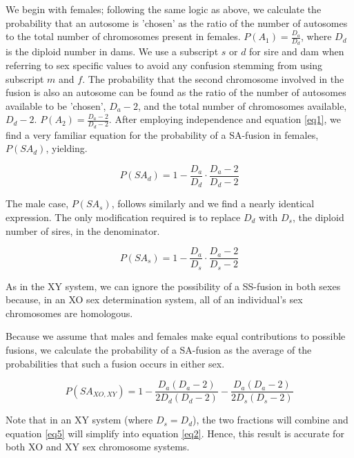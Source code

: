 \documentclass[12pt]{article}
\begin{document}
We begin with females; following the same logic as above, we calculate the probability that an autosome is 'chosen' as the ratio of the number of autosomes to the total number of chromosomes present in females.
$P(A_1) = \frac{D_a}{D_d}$, where $D_d$ is the diploid number in dams. 
We use a subscript $s$ or $d$ for sire and dam when referring to sex specific values to avoid any confusion stemming from using subscript $m$ and $f$.
The probability that the second chromosome involved in the fusion is also an autosome can be found as the ratio of the number of autosomes available to be 'chosen', $D_a - 2$, and the total number of chromosomes available, $D_d - 2$. 
$P(A_2) = \frac{D_a - 2}{D_d - 2}$. 
After employing independence and equation \ref{eq1}, we find a very familiar equation for the probability of a SA-fusion in females, $P(SA_d)$, yielding. 

\begin{equation} \label{eq3}
    P(SA_d) =  1 - \frac{D_a}{D_d} \cdot \frac{D_a - 2}{D_d - 2}
\end{equation}

The male case, $P(SA_s)$, follows similarly and we find a nearly identical expression.
The only modification required is to replace $D_d$ with $D_s$, the diploid number of sires, in the denominator.

\begin{equation} \label{eq4}
    P(SA_s) = 1 - \frac{D_a}{D_s} \cdot \frac{D_a - 2}{D_s - 2}
\end{equation}

As in the XY system, we can ignore the possibility of a SS-fusion in both sexes because, in an XO sex determination system, all of an individual's sex chromosomes are homologous.

Because we assume that males and females make equal contributions to possible fusions, we calculate the probability of a SA-fusion as the average of the probabilities that such a fusion occurs in either sex.

    \begin{equation} \label{eq5}
        P(SA_{XO,XY}) = 1 - \frac{D_a  (D_a - 2)}{2 D_d  (D_d - 2)} - \frac{D_a  (D_a - 2)}{2 D_s  (D_s - 2)}
    \end{equation}
    
Note that in an XY system (where $D_s = D_d$), the two fractions will combine and equation \ref{eq5} will simplify into equation \ref{eq2}. 
Hence, this result is accurate for both XO and XY sex chromosome systems.
 
\end{document}
